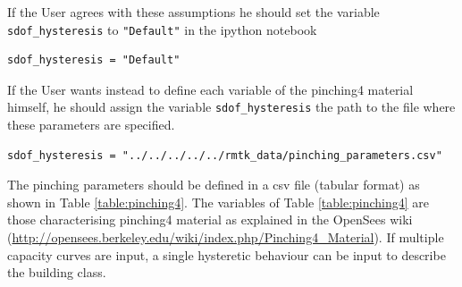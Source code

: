 If the User agrees with these assumptions he should set the variable \verb=sdof_hysteresis= to \verb="Default"= in the ipython notebook

\begin{Verbatim}[frame=single, commandchars=\\\{\}, samepage=true]
sdof_hysteresis = "Default"
\end{Verbatim}

If the User wants instead to define each variable of the pinching4 material himself, he should assign the variable \verb=sdof_hysteresis= the path to the file where these parameters are specified.

\begin{Verbatim}[frame=single, commandchars=\\\{\}, samepage=true]
sdof_hysteresis = "../../../../../rmtk_data/pinching_parameters.csv"
\end{Verbatim}

The pinching parameters should be defined in a csv file (tabular format) as shown in Table \ref{table:pinching4}. The variables of Table \ref{table:pinching4} are those characterising pinching4 material as explained in the OpenSees wiki (\href{http://opensees.berkeley.edu/wiki/index.php/Pinching4_Material}{http://opensees.berkeley.edu/wiki/index.php/Pinching4\_Material}). If multiple capacity curves are input, a single hysteretic behaviour can be input to describe the building class.\\

